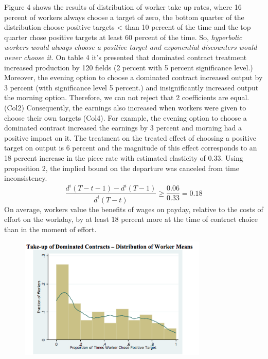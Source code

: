 \documentclass[a4paper,12pt]{article}
\begin{document}
Figure 4 shows the results of distribution of worker take up rates, where 16 percent of workers always choose a target of zero, the bottom quarter of the distribution choose positive targets < than 10 percent of the time and the top quarter chose positive targets at least 60 percent of the time. So, \textit{hyperbolic workers would always choose a positive target and exponential discounters would never choose it.} On table 4 it's presented that dominated contract treatment increased production by 120 fields (2 percent with 5 percent significance level.) Moreover, the evening option to choose a dominated contract increased output by 3 percent (with significance level 5 percent.) and insignificantly increased output the morning option. Therefore, we can not reject that 2 coefficients are equal.(Col2) Consequently, the earnings also increased when workers were given to choose their own targets (Col4). For example, the evening option to choose a dominated contract increased the earnings by 3 percent and morning had a positive impact on it. The treatment on the treated effect of choosing a positive target on output is 6 percent and the magnitude of this effect corresponds to an 18 percent increase in the piece rate with estimated elasticity of 0.33.  Using proposition 2, the implied bound on the departure was canceled from time inconsistency.  
\begin{equation}
  \frac{d^i (T-t-1)-d^i(T-1)}{d^i(T-t)} \geq \frac{0.06}{0.33} = 0.18
\end{equation}
On average, workers value the benefits of wages on payday, relative to the costs of effort on the workday, by at least 18 percent more at the time of contract choice than in the moment of effort. 

\begin{figure}[h]
\centering
\includegraphics[width=0.8\textwidth]{Figure1_4.png}
\caption{\label{fig:Figure4}}
\end{figure}
\end{document}

